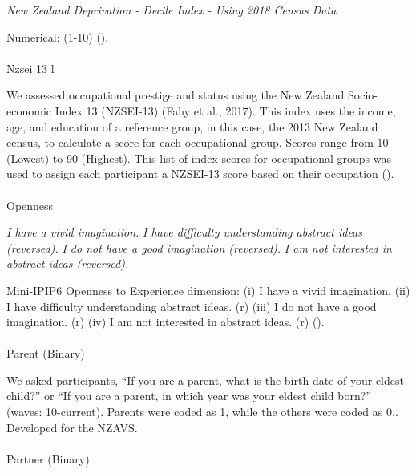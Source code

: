 \documentclass[
  single column]{article}
\makeatletter
\let\oldparagraph\paragraph
\renewcommand{\paragraph}{
    \@ifstar
      \xxxParagraphStar
      \xxxParagraphNoStar
  }
\newcommand{\xxxParagraphStar}[1]{\oldparagraph*{#1}\mbox{}}
\newcommand{\xxxParagraphNoStar}[1]{\oldparagraph{#1}\mbox{}}
\makeatother
\begin{document}
\emph{New Zealand Deprivation - Decile Index - Using 2018 Census Data}

Numerical: (1-10) ().

\paragraph{Nzsei 13 l}\label{nzsei-13-l}

We assessed occupational prestige and status using the New Zealand
Socio-economic Index 13 (NZSEI-13) (Fahy et al., 2017). This index uses
the income, age, and education of a reference group, in this case, the
2013 New Zealand census, to calculate a score for each occupational
group. Scores range from 10 (Lowest) to 90 (Highest). This list of index
scores for occupational groups was used to assign each participant a
NZSEI-13 score based on their occupation ().

\paragraph{Openness}\label{openness}

\emph{I have a vivid imagination.} \emph{I have difficulty understanding
abstract ideas (reversed).} \emph{I do not have a good imagination
(reversed).} \emph{I am not interested in abstract ideas (reversed).}

Mini-IPIP6 Openness to Experience dimension: (i) I have a vivid
imagination. (ii) I have difficulty understanding abstract ideas. (r)
(iii) I do not have a good imagination. (r) (iv) I am not interested in
abstract ideas. (r) ().

\paragraph{Parent (Binary)}\label{parent-binary}

We asked participants, ``If you are a parent, what is the birth date of
your eldest child?'' or ``If you are a parent, in which year was your
eldest child born?'' (waves: 10-current). Parents were coded as 1, while
the others were coded as 0.. Developed for the NZAVS.

\paragraph{Partner (Binary)}\label{partner-binary}
\end{document}

